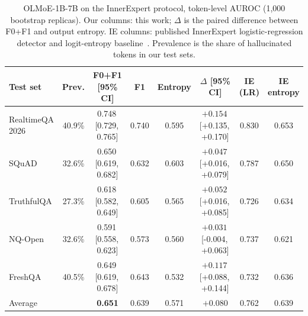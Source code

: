 \documentclass[11pt]{article}
\newcommand{\FO}{\textsf{F1}}
\newcommand{\FZO}{\textsf{F0+F1}}
\newcommand{\ci}[2]{\,[#1,\,#2]}
\begin{document}
\begin{table}[t]
\centering
\footnotesize
\setlength{\tabcolsep}{3pt}
\caption{OLMoE-1B-7B on the InnerExpert protocol, token-level AUROC (1,000 bootstrap replicas). Our columns: this work; $\Delta$ is the paired difference between \FZO{} and output entropy. IE columns: published InnerExpert logistic-regression detector and logit-entropy baseline~\citep{fonseca2026innerexpert}. Prevalence is the share of hallucinated tokens in our test sets.}
\label{tab:innerexpert}
\begin{tabular}{lccccccc}
\toprule
Test set & Prev. & \FZO{} [95\% CI] & \FO{} & Entropy & $\Delta$ [95\% CI] & IE (LR) & IE entropy \\
\midrule
RealtimeQA 2026 & 40.9\% & 0.748\ci{0.729}{0.765} & 0.740 & 0.595 & $+0.154$\ci{+0.135}{+0.170} & 0.830 & 0.653 \\
SQuAD & 32.6\% & 0.650\ci{0.619}{0.682} & 0.632 & 0.603 & $+0.047$\ci{+0.016}{+0.079} & 0.787 & 0.650 \\
TruthfulQA & 27.3\% & 0.618\ci{0.582}{0.649} & 0.605 & 0.565 & $+0.052$\ci{+0.016}{+0.085} & 0.726 & 0.634 \\
NQ-Open & 32.6\% & 0.591\ci{0.558}{0.623} & 0.573 & 0.560 & $+0.031$\ci{-0.004}{+0.063} & 0.737 & 0.621 \\
FreshQA & 40.5\% & 0.649\ci{0.619}{0.678} & 0.643 & 0.532 & $+0.117$\ci{+0.088}{+0.144} & 0.732 & 0.636 \\
\midrule
Average & & \textbf{0.651} & 0.639 & 0.571 & $+0.080$ & 0.762 & 0.639 \\
\bottomrule
\end{tabular}
\end{table}
\end{document}
